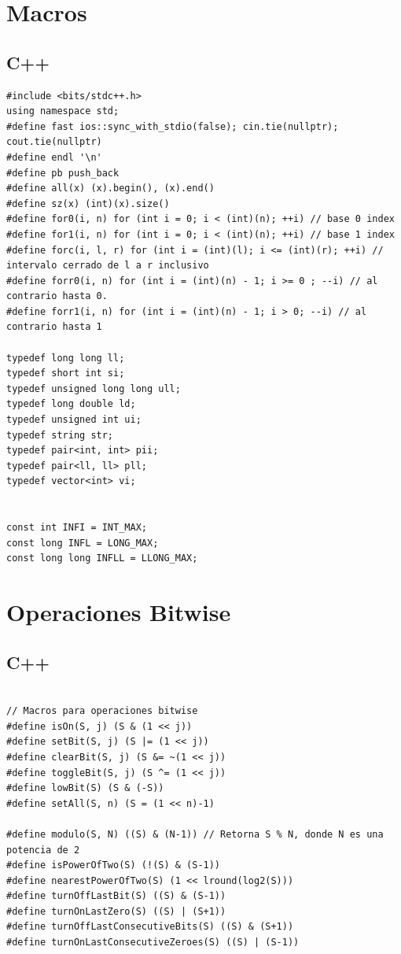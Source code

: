 \documentclass{article}
\begin{document}
\section{Macros}

\subsection{C++}


\begin{lstlisting}[style=cppstyle]
#include <bits/stdc++.h>
using namespace std;
#define fast ios::sync_with_stdio(false); cin.tie(nullptr); cout.tie(nullptr)
#define endl '\n'
#define pb push_back
#define all(x) (x).begin(), (x).end()
#define sz(x) (int)(x).size()
#define for0(i, n) for (int i = 0; i < (int)(n); ++i) // base 0 index
#define for1(i, n) for (int i = 0; i < (int)(n); ++i) // base 1 index
#define forc(i, l, r) for (int i = (int)(l); i <= (int)(r); ++i) // intervalo cerrado de l a r inclusivo
#define forr0(i, n) for (int i = (int)(n) - 1; i >= 0 ; --i) // al contrario hasta 0.
#define forr1(i, n) for (int i = (int)(n) - 1; i > 0; --i) // al contrario hasta 1

typedef long long ll;
typedef short int si;
typedef unsigned long long ull;
typedef long double ld;
typedef unsigned int ui;
typedef string str;
typedef pair<int, int> pii;
typedef pair<ll, ll> pll;
typedef vector<int> vi;


const int INFI = INT_MAX;
const long INFL = LONG_MAX;
const long long INFLL = LLONG_MAX;

\end{lstlisting}


\section{Operaciones Bitwise}

\subsection{C++}

\begin{lstlisting}[style=cppstyle]

// Macros para operaciones bitwise
#define isOn(S, j) (S & (1 << j))
#define setBit(S, j) (S |= (1 << j))
#define clearBit(S, j) (S &= ~(1 << j))
#define toggleBit(S, j) (S ^= (1 << j))
#define lowBit(S) (S & (-S))
#define setAll(S, n) (S = (1 << n)-1)

#define modulo(S, N) ((S) & (N-1)) // Retorna S % N, donde N es una potencia de 2
#define isPowerOfTwo(S) (!(S) & (S-1))
#define nearestPowerOfTwo(S) (1 << lround(log2(S)))
#define turnOffLastBit(S) ((S) & (S-1))
#define turnOnLastZero(S) ((S) | (S+1))
#define turnOffLastConsecutiveBits(S) ((S) & (S+1))
#define turnOnLastConsecutiveZeroes(S) ((S) | (S-1))

\end{lstlisting}
\end{document}

